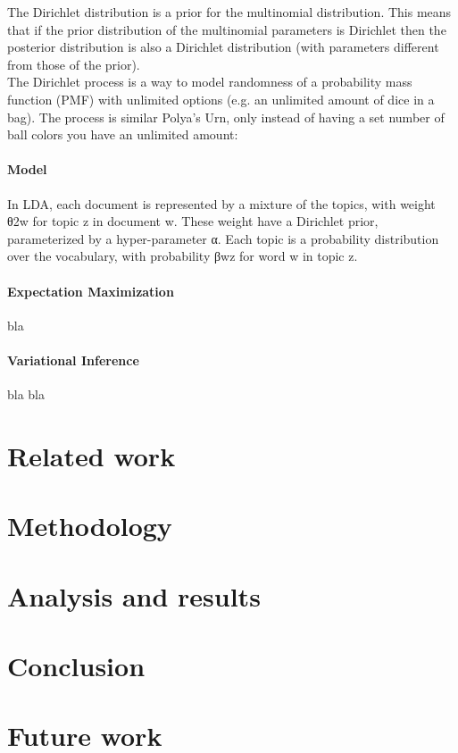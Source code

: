 \documentclass[12pt]{report}
\begin{document}
\vspace{3mm}

The Dirichlet distribution is a prior for the multinomial distribution. This means that if the prior distribution of the multinomial parameters is Dirichlet then the posterior distribution is also a Dirichlet distribution (with parameters different from those of the prior).\\
The Dirichlet process is a way to model randomness of a probability mass function (PMF) with unlimited options (e.g. an unlimited amount of dice in a bag). The process is similar Polya’s Urn, only instead of having a set number of ball colors you have an unlimited amount:



\vspace{10mm}

\paragraph{Model}

\vspace{5mm}

In LDA, each document is represented by a mixture of the topics, with weight θ2w for topic z in document w. These weight have a Dirichlet prior, parameterized by a hyper-parameter α. Each topic is a probability distribution over the vocabulary, with probability βwz for word w in topic z.

\vspace{10mm}

\paragraph{Expectation Maximization}

\vspace{5mm}
bla
\vspace{10mm}

\paragraph{Variational Inference}

\vspace{5mm}
bla bla

\vspace{10mm}

\section{Related work}

\section{Methodology}

\section{Analysis and results}

\section{Conclusion}

\section{Future work}
\end{document}
